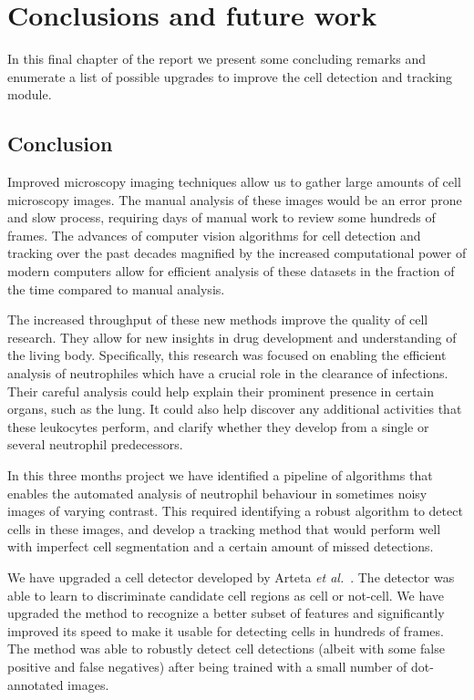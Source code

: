 		
\chapter{Conclusions and future work\statusfirstdraft}
\label{chap:conclusion}

In this final chapter of the report we present some concluding remarks and enumerate a list of possible upgrades to improve the cell detection and tracking module.

\section{Conclusion \statusfirstdraft}
\label{sec:conclusion_conclusion}

Improved microscopy imaging techniques allow us to gather large amounts of cell microscopy images. The manual analysis of these images would be an error prone and slow process, requiring days of manual work to review some hundreds of frames. The advances of computer vision algorithms for cell detection and tracking over the past decades magnified by the increased computational power of modern computers allow for efficient analysis of these datasets in the fraction of the time compared to manual analysis.

The increased throughput of these new methods improve the quality of cell research. They allow for new insights in drug development and understanding of the living body. Specifically, this research was focused on enabling the efficient analysis of neutrophiles which have a crucial role in the clearance of infections. Their careful analysis could help explain their prominent presence in certain organs, such as the lung. It could also help discover any additional activities that these leukocytes perform, and clarify whether they develop from a single or several neutrophil predecessors.

In this three months project we have identified a pipeline of algorithms that enables the automated analysis of neutrophil behaviour in sometimes noisy images of varying contrast. This required identifying a robust algorithm to detect cells in these images, and develop a tracking method that would perform well with imperfect cell segmentation and a certain amount of missed detections.

We have upgraded a cell detector developed by Arteta \emph{et al.}~\cite{arteta12}. The detector was able to learn to discriminate candidate cell regions as cell or not-cell. We have upgraded the method to recognize a better subset of features and significantly improved its speed to make it usable for detecting cells in hundreds of frames. The method was able to robustly detect cell detections (albeit with some false positive and false negatives) after being trained with a small number of dot-annotated images.

